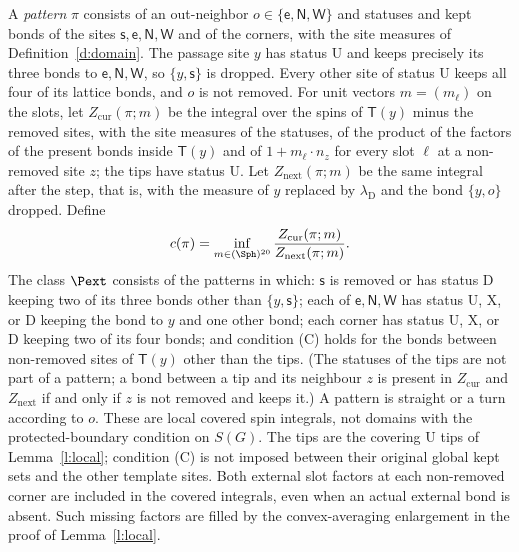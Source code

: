 \begin{definition}\label{d:pattern}
A \emph{pattern} $\pi$ consists of an out-neighbor
$o\in\{\mathsf e,\mathsf N,\mathsf W\}$ and statuses and kept bonds
of the sites $\mathsf s,\mathsf e,\mathsf N,\mathsf W$ and of the
corners, with the site measures of Definition~\ref{d:domain}. The
passage site $y$ has status $\mathrm U$ and keeps precisely its three
bonds to $\mathsf e,\mathsf N,\mathsf W$, so $\{y,\mathsf s\}$ is
dropped. Every other site of status $\mathrm U$ keeps all four of
its lattice bonds, and $o$ is not removed. For unit vectors
$m=(m_\ell)$ on the slots, let $Z_{\mathrm{cur}}(\pi;m)$ be the
integral over the spins of $\mathsf T(y)$ minus the removed sites,
with the site measures of the statuses, of the product of the factors
of the present bonds inside $\mathsf T(y)$ and of
$1+m_\ell\cdot n_z$ for every slot $\ell$ at a non-removed site $z$;
the tips have status $\mathrm U$. Let
$Z_{\mathrm{next}}(\pi;m)$ be the same integral after the step,
that is, with the measure of $y$ replaced by $\lambda_{\mathrm D}$
and the bond $\{y,o\}$ dropped. Define
\begin{equation}\label{e:cpi}
c(\pi) = \inf_{m \in (\Sph)^{20}} \frac{Z_{\mathrm{cur}}(\pi; m)}{Z_{\mathrm{next}}(\pi; m)} .
\end{equation}
The class $\Pext$ consists of the patterns in which: $\mathsf s$ is removed or has status $\mathrm D$ keeping two of its three bonds other than $\{y, \mathsf s\}$; each of $\mathsf e, \mathsf N, \mathsf W$ has status $\mathrm U$, $\mathrm X$, or $\mathrm D$ keeping the bond to $y$ and one other bond; each corner has status $\mathrm U$, $\mathrm X$, or $\mathrm D$ keeping two of its four bonds; and condition (C) holds for the bonds between non-removed sites of $\mathsf T(y)$ other than the tips. (The statuses of the tips are not part of a pattern; a bond between a tip and its neighbour $z$ is present in $Z_{\mathrm{cur}}$ and $Z_{\mathrm{next}}$ if and only if $z$ is not removed and keeps it.) A pattern is straight or a turn according to $o$.
These are local covered spin integrals, not domains with the
protected-boundary condition on $S(G)$. The tips are the covering
$\mathrm U$ tips of Lemma~\ref{l:local}; condition (C) is not imposed
between their original global kept sets and the other template sites.
Both external slot factors at each non-removed corner are included in
the covered integrals, even when an actual external bond is absent.
Such missing factors are filled by the convex-averaging enlargement
in the proof of Lemma~\ref{l:local}.
\end{definition}

